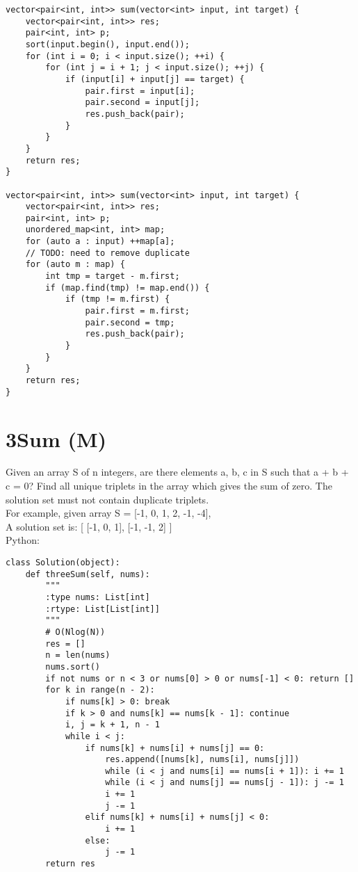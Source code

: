\begin{lstlisting}
vector<pair<int, int>> sum(vector<int> input, int target) {
    vector<pair<int, int>> res;
    pair<int, int> p;
    sort(input.begin(), input.end());
    for (int i = 0; i < input.size(); ++i) {
        for (int j = i + 1; j < input.size(); ++j) {
            if (input[i] + input[j] == target) {
                pair.first = input[i];
                pair.second = input[j];
                res.push_back(pair);
            }
        }
    }
    return res;
}

vector<pair<int, int>> sum(vector<int> input, int target) {
    vector<pair<int, int>> res;
    pair<int, int> p;
    unordered_map<int, int> map;
    for (auto a : input) ++map[a];
    // TODO: need to remove duplicate
    for (auto m : map) {
        int tmp = target - m.first;
        if (map.find(tmp) != map.end()) {
            if (tmp != m.first) {
                pair.first = m.first;
                pair.second = tmp;
                res.push_back(pair);
            }
        }
    }
    return res;
}
\end{lstlisting}

\section{3Sum (M)}
Given an array S of n integers, are there elements a, b, c in S such that a + b + c = 0? Find all unique triplets in the array which gives the sum of zero. The solution set must not contain duplicate triplets.\\

For example, given array S = [-1, 0, 1, 2, -1, -4], \\
A solution set is:
[
  [-1, 0, 1],
  [-1, -1, 2]
] \\

Python:
\lstset{language=python}
\begin{lstlisting}
class Solution(object):
    def threeSum(self, nums):
        """
        :type nums: List[int]
        :rtype: List[List[int]]
        """
        # O(Nlog(N))
        res = []
        n = len(nums)
        nums.sort()
        if not nums or n < 3 or nums[0] > 0 or nums[-1] < 0: return []
        for k in range(n - 2):
            if nums[k] > 0: break
            if k > 0 and nums[k] == nums[k - 1]: continue
            i, j = k + 1, n - 1
            while i < j:
                if nums[k] + nums[i] + nums[j] == 0:
                    res.append([nums[k], nums[i], nums[j]])
                    while (i < j and nums[i] == nums[i + 1]): i += 1
                    while (i < j and nums[j] == nums[j - 1]): j -= 1
                    i += 1
                    j -= 1
                elif nums[k] + nums[i] + nums[j] < 0:
                    i += 1
                else:
                    j -= 1
        return res
\end{lstlisting}

